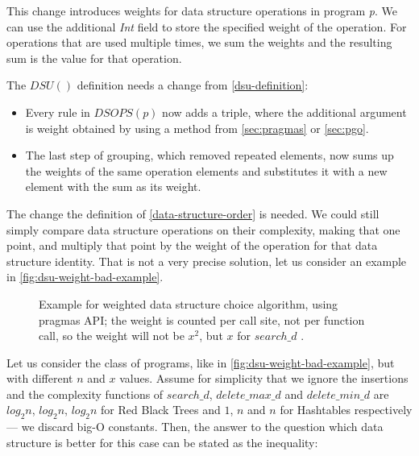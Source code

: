 \documentclass[a4paper,11pt]{article}
\begin{document}
			This change introduces weights for data structure operations in program \emph{p}. We can use the
			additional \emph{Int} field to store the specified weight of the operation. For operations that are used
			multiple times, we sum the weights and the resulting sum is the value for that operation.

			The $DSU()$ definition needs a change from \autoref{dsu-definition}:

			\begin{itemize}
				\item Every rule in $DSOPS(p)$ now adds a triple, where the additional argument is
					weight obtained by using a method from \autoref{sec:pragmas} or
					\autoref{sec:pgo}.

				\item The last step of grouping, which removed repeated elements, now sums up the weights
					of the same operation elements and substitutes it with a new element with the
					sum as its weight.
			\end{itemize}

            The change the definition of \autoref{data-structure-order} is needed. We could still simply compare data
            structure operations on their complexity, making that one point, and multiply that point by the weight of
            the operation for that data structure identity. That is not a very precise solution, let us consider an
            example in \autoref{fig:dsu-weight-bad-example}.

            \begin{figure}[!h]
                

                \caption{Example for weighted data structure choice algorithm, using pragmas API; the weight is
                counted per call site, not per function call, so the weight will not be $x^2$, but $x$ for $search\_d$ .}

                \label{fig:dsu-weight-bad-example}
            \end{figure}

            Let us consider the class of programs, like in \autoref{fig:dsu-weight-bad-example}, but with different $n$
            and $x$ values. Assume for simplicity that we ignore the insertions and the complexity functions of $search\_d$,
            $delete\_max\_d$ and $delete\_min\_d$ are $log_2 n$, $log_2 n$, $log_2 n$ for Red Black Trees and $1$, $n$ and $n$
            for Hashtables respectively --- we discard big-O constants. Then, the answer to the question which data structure 
            is better for this case can be stated as the inequality:
\end{document}
